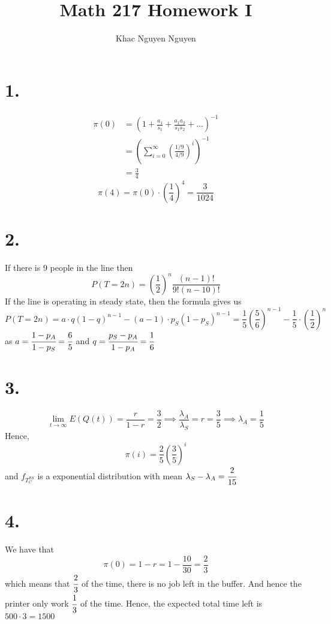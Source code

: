 \documentclass[11pt]{article}
\title{\textbf{Math 217 Homework I}}
\author{Khac Nguyen Nguyen}
\date{}
\begin{document}
\section*{1.}
\begin{equation*}
    \begin{aligned}
        \pi(0) 
        &= \left(1 + \frac{a_1}{s_1} +  \frac{a_1 a_2}{s_1 s_2} + \ldots \right)^{-1} \\
        &= \left(\sum_{i=0}^\infty \left(\frac{1/9}{4/9}\right)^i \right)^{-1} \\
        &= \frac{3}{4}
    \end{aligned}
\end{equation*}
\[
    \pi(4) = \pi(0) \cdot \left(\frac{1}{4}\right)^4 = \frac{3}{1024}    
\]
\pagebreak
\section*{2.}
If there is 9 people in the line then 
\[
    P(T=2n) = \left(\frac{1}{2}\right)^n \frac{(n-1)!}{9!(n-10)!}    
\]
If the line is operating in steady state, then the formula gives us 
\[
    P(T=2n) = a \cdot q(1-q)^{n-1} - (a-1)\cdot p_S(1-p_S)^{n-1} 
    = \frac{1}{5} \left(\frac{5}{6}\right)^{n-1} - \frac{1}{5} \cdot \left(\frac{1}{2}\right)^n
\]
as $a=\cfrac{1-p_A}{1-p_S} = \cfrac{6}{5}$ and $q = \cfrac{p_S-p_A}{1-p_A} = \cfrac{1}{6}$
\pagebreak
\section*{3.}
\[
    \lim_{t \to \infty} E(Q(t)) = \frac{r}{1-r} = \frac{3}{2} \implies \frac{\lambda_A}{\lambda_S} = r=\frac{3}{5} \implies \lambda_A = \frac{1}{5}   
\]
Hence, 
\[
    \pi(i) = \frac{2}{5} \left(\frac{3}{5}\right)^i    
\]
and $f_{T_C^{SS}}$ is a exponential distribution with mean $\lambda_S - \lambda_A = \cfrac{2}{15}$
\pagebreak
\section*{4.}
We have that 
\[
    \pi(0) = 1-r = 1-\frac{10}{30} = \frac{2}{3}
\]
which means that $\cfrac{2}{3}$ of the time, there is no job left in the buffer. And hence the 
printer only work $\cfrac{1}{3}$ of the time. Hence, the expected total time left is $500 \cdot 3 = 1500$
\end{document}
